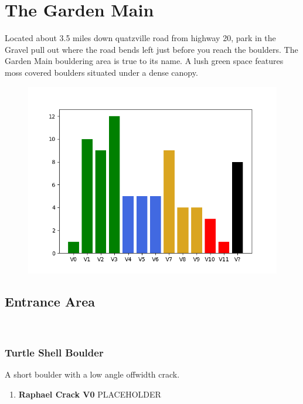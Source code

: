 \chapter{The Garden Main}\label{a:The Garden Main}
\lhead{\textcolor{\chapterColor}{\rule[-2pt]{\textwidth}{15pt}}}
Located about 3.5 miles down quatzville road from highway 20, park in the Gravel pull out where the road bends left just before you reach the boulders. The Garden Main bouldering area is true to its name. A lush green space features moss covered boulders situated under a dense canopy.
\begin{figure}[h]
  \centering
    \includegraphics[width=\linewidth]{./maps/plots/The Garden Main.png}
\end{figure}

\section{Entrance Area}\label{sa:Entrance Area}
\
\subsection*{Turtle Shell Boulder}\label{bf:Turtle Shell Boulder}
A short boulder with a low angle offwidth crack.

\begin{enumerate}[]
	\item\label{rt:Raphael Crack} \colorbox{green!20}{\textbf{Raphael Crack V0  } }
	\newline PLACEHOLDER\
\end{enumerate}
